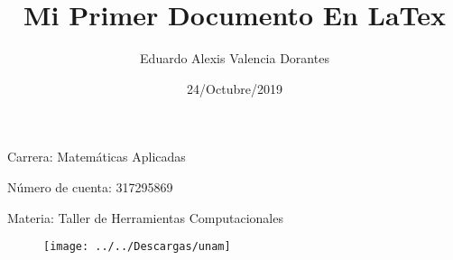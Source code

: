 \documentclass{article}%
\title{Mi Primer Documento En LaTex}
\author{Eduardo Alexis Valencia Dorantes}
\date{24/Octubre/2019}
\begin{document}
	\begin{titlepage}
		\maketitle
	\end{titlepage}

Carrera: Matemáticas Aplicadas

Número de cuenta: 317295869

Materia: Taller de Herramientas Computacionales
\vfill

\begin{figure}
	\centering
	\texttt{[image: ../../Descargas/unam]}
	\caption{}
	\label{fig:unam}
\end{figure}
\end{document}
